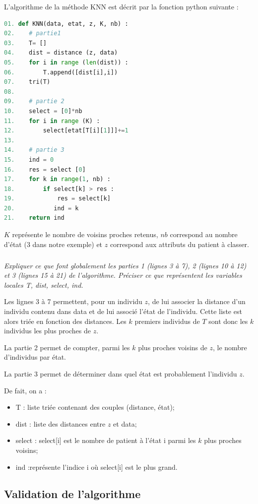 L’algorithme de la méthode KNN est décrit par la fonction python suivante :
\begin{lstlisting}[language=Python]
01. def KNN(data, etat, z, K, nb) :
02.    # partie1
03.    T= []
04.    dist = distance (z, data)
05.    for i in range (len(dist)) :
06.        T.append([dist[i],i])
07.    tri(T)
08.
09.    # partie 2
10.    select = [0]*nb
11.    for i in range (K) :
12.        select[etat[T[i][1]]]+=1
13.
14.    # partie 3
15.    ind = 0
16.    res = select [0]
17.    for k in range(1, nb) :
18.        if select[k] > res :
19.            res = select[k]
20.           ind = k
21.    return ind
\end{lstlisting}

$K$ représente le nombre de voisins proches retenus, $nb$ correspond au nombre d’état (3 dans notre
exemple) et $z$ correspond aux attributs du patient à classer.

\fi

\subparagraph{}\textit{Expliquer ce que font globalement les parties 1 (lignes 3 à 7), 2 (lignes 10 à 12) et 3 (lignes 15
à 21) de l’algorithme. Préciser ce que représentent les variables locales T, dist, select, ind.}
\ifprof
\begin{corrige}
Les lignes 3 à 7 permettent, pour un individu $z$, de lui associer la distance d'un individu contenu dans data et de lui associé l'état de l'individu. 
Cette liste est alors triée en fonction des distances. Les $k$ premiers individus de $T$ sont donc les $k$ individus les plus proches de $z$.

La partie 2 permet de compter, parmi les $k$ plus proches voisins de $z$, le nombre d'individus par état.

La partie 3 permet de déterminer dans quel état est probablement l'individu $z$.

De fait, on a :
\begin{itemize}
\item T : liste triée contenant des couples (distance, état);
\item dist : liste des distances entre $z$ et data;
\item select : select[i] est le nombre de patient à l'état i parmi les $k$ plus proches voisins;
\item ind :représente l'indice i où select[i] est le plus grand.
\end{itemize}
\end{corrige}
\else
\fi

\subsection*{Validation de l’algorithme}

